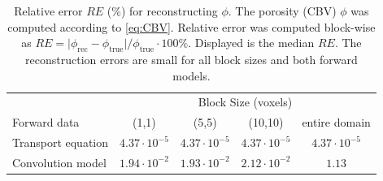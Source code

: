 \documentclass[paper=a4, fontsize=11pt,parskip=half,headings=small]{scrartcl}
\begin{document}
	\begin{table}[H]
		\caption{Relative error $RE$ (\%) for reconstructing $\phi$. The porosity (CBV) $\phi$ was computed according to \eqref{eq:CBV}. Relative error was computed block-wise as $RE = \vert \phi_{\mathrm{rec}} - \phi_{\mathrm{true}}\vert / \phi_{\mathrm{true}}\cdot 100\%$. Displayed is the median $RE$. The reconstruction errors are small for all block sizes and both forward models. }
		\centering
		\begin{tabular}{l c c c c }
			 & \multicolumn{4}{c}{Block Size (voxels)}\\
			Forward data 		& (1,1) 	& (5,5)		& (10,10)	& entire domain \\
			\toprule
			Transport equation  & $4.37\cdot10^{-5}$      & $4.37\cdot10^{-5}$		& $4.37\cdot10^{-5}$		& $4.37\cdot10^{-5}$ \\											
			Convolution model  & $1.94\cdot10^{-2}$   & $1.93\cdot10^{-2}$		& $2.12\cdot10^{-2}$		& $1.13$ 			
		\end{tabular}
		\label{tab:resultsSimphi}
	\end{table}
\end{document}
